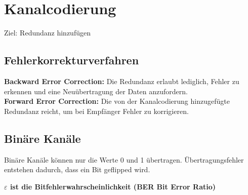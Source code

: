 \section{Kanalcodierung}
Ziel: Redundanz hinzufügen

\subsection{Fehlerkorrekturverfahren}
\textbf{Backward Error Correction: } Die Redundanz erlaubt lediglich, Fehler zu erkennen und eine Neuübertragung der Daten anzufordern. \\
\textbf{Forward Error Correction: } Die von der Kanalcodierung hinzugefügte Redundanz reicht, um bei Empfänger Fehler zu korrigieren.

\subsection{Binäre Kanäle}%
Binäre Kanäle können nur die Werte 0 und 1 übertragen. Übertragungsfehler entstehen dadurch, dass ein Bit geflipped wird.

\textbf{$\varepsilon$ ist die Bitfehlerwahrscheinlichkeit (BER Bit Error Ratio)}

